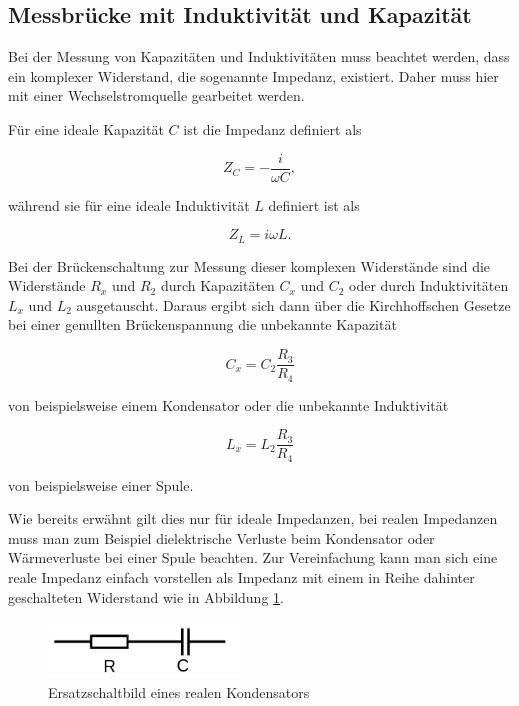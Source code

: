 \subsection{Messbrücke mit Induktivität und Kapazität}

Bei der Messung von Kapazitäten und Induktivitäten muss beachtet werden, dass
ein komplexer Widerstand, die sogenannte Impedanz, existiert.
Daher muss hier mit einer Wechselstromquelle gearbeitet werden.

\newpage

Für eine ideale Kapazität $C$ ist die Impedanz definiert als

\begin{equation}
  Z_C = - \frac{i}{\omega C} ,
\end{equation}

während sie für eine ideale Induktivität $L$ definiert ist als

\begin{equation}
  Z_L = i \omega L .
\end{equation}

Bei der Brückenschaltung zur Messung dieser komplexen Widerstände sind
die Widerstände $R_x$ und $R_2$ durch Kapazitäten $C_x$ und $C_2$ oder
durch Induktivitäten $L_x$ und $L_2$ ausgetauscht.
Daraus ergibt sich dann über die Kirchhoffschen Gesetze bei einer
genullten Brückenspannung die unbekannte Kapazität

\begin{equation}
  C_x = C_2\frac{R_3}{R_4}
  \label{eqn:KapId}
\end{equation}

von beispielsweise einem Kondensator oder die unbekannte Induktivität

\begin{equation}
  L_x = L_2\frac{R_3}{R_4}
  \label{eqn:IndId}
\end{equation}

von beispielsweise einer Spule.

Wie bereits erwähnt gilt dies nur für ideale Impedanzen, bei realen
Impedanzen muss man zum Beispiel dielektrische Verluste beim Kondensator
oder Wärmeverluste bei einer Spule beachten. Zur Vereinfachung kann man
sich eine reale Impedanz einfach vorstellen als Impedanz mit einem in Reihe
dahinter geschalteten Widerstand wie in Abbildung \ref{fig:ReiheImp}.

\begin{figure}
  \centering
  \includegraphics[height=1.5cm]{ReiheImp.png}
  \caption{Ersatzschaltbild eines realen Kondensators}
  \label{fig:ReiheImp}
\end{figure}


